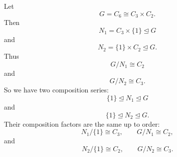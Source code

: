 \begin{example}
    Let
    \[
        G=C_6\cong C_3\times C_2.
    \]
    Then
    \[
        N_1=C_3\times \{1\}\trianglelefteq G
    \]
    and
    \[
        N_2=\{1\}\times C_2\trianglelefteq G.
    \]
    Thus
    \[
        G/N_1\cong C_2
    \]
    and
    \[
        G/N_2\cong C_3.
    \]
    So we have two composition series:
    \[
        \{1\}\trianglelefteq N_1\trianglelefteq G
    \]
    and
    \[
        \{1\}\trianglelefteq N_2\trianglelefteq G.
    \]
    Their composition factors are the same up to order:
    \[
        N_1/\{1\}\cong C_3,\qquad G/N_1\cong C_2,
    \]
    and
    \[
        N_2/\{1\}\cong C_2,\qquad G/N_2\cong C_3.
    \]
\end{example}